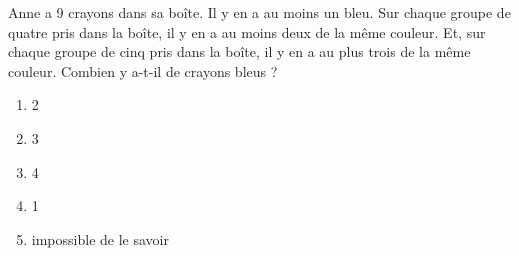 Anne a 9 crayons dans sa boîte. Il y en a au moins un bleu. Sur chaque groupe de quatre pris
dans la boîte, il y en a au moins deux de la même couleur. Et, sur chaque groupe de cinq pris dans la boîte, il y en a au plus trois de la même couleur. Combien y a-t-il de crayons bleus ?
\begin{multicols}{5}
  \begin{enumerate}[A/]
  \item 2
  \item 3
  \item 4
  \item 1
  \item impossible de le savoir
  \end{enumerate}
\end{multicols}